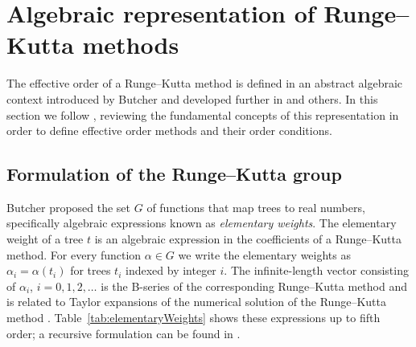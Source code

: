 \section{Algebraic representation of Runge--Kutta methods}\label{sec:Algebraic_RK}

The effective order of a Runge--Kutta method is defined in an abstract algebraic
context introduced by Butcher \cite{Butcher1969} and developed further in
\cite{Butcher1972, Hairer1974, Butcher1996, Butcher1998} and others.
In this section we follow \cite{Butcher2008_book}, reviewing the fundamental
concepts of this representation in order to define effective order methods
and their order conditions.


\subsection{Formulation of the Runge--Kutta group}\label{sec:RK_group}



Butcher \cite{Butcher1972} proposed the set $G$ of functions that map
trees to real numbers, specifically algebraic expressions known as
\emph{elementary weights}.
The elementary weight of a tree $t$
is an algebraic expression in the coefficients of a Runge--Kutta method.
For every function $\alpha \in G$ we write the elementary weights as
$\alpha_{i} = \alpha(t_{i})$
for trees $t_{i}$ indexed by integer $i$.
The infinite-length vector consisting of $\alpha_i$, $i = 0, 1, 2,
\ldots$ is the B-series of the corresponding Runge--Kutta method and
is related to Taylor expansions of the numerical solution of the
Runge--Kutta method \cite{Hairer1974, Butcher2008_book}.
Table~\ref{tab:elementaryWeights} shows these
expressions up to fifth order; a recursive formulation
can be found in \cite[Definition 312]{Butcher2008_book}.



